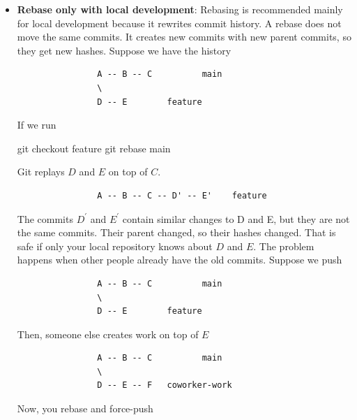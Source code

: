 \documentclass{report}
\begin{document}
\begin{itemize}
        \item \textbf{Rebase only with local development}: 
            Rebasing is recommended mainly for local development because it rewrites commit history.
            \bigbreak \noindent 
            A rebase does not move the same commits. It creates new commits with new parent commits, so they get new hashes.
            \bigbreak \noindent 
            Suppose we have the history
            \bigbreak \noindent 
            \begin{verbatim}
                A -- B -- C          main
                \
                D -- E        feature
            \end{verbatim}
            \bigbreak \noindent 
            If we run
            \bigbreak \noindent 
            \begin{bashcode}
                git checkout feature
                git rebase main
            \end{bashcode}
            \bigbreak \noindent 
            Git replays $D$ and $E$ on top of $C$.
            \bigbreak \noindent 
            \begin{verbatim}
                A -- B -- C -- D' -- E'    feature 
            \end{verbatim}
            \bigbreak \noindent 
            The commits $D^{\prime}$ and $E^{\prime}$ contain similar changes to D and E, but they are not the same commits. Their parent changed, so their hashes changed.
            \bigbreak \noindent 
            That is safe if only your local repository knows about $D$ and $E$.
            \bigbreak \noindent 
            The problem happens when other people already have the old commits.
            \bigbreak \noindent 
            Suppose we push
            \bigbreak \noindent 
            \begin{verbatim}
                A -- B -- C          main
                \
                D -- E        feature     
            \end{verbatim}
            \bigbreak \noindent 
            Then, someone else creates work on top of $E$
            \bigbreak \noindent 
            \begin{verbatim}
                A -- B -- C          main
                \
                D -- E -- F   coworker-work 
            \end{verbatim}
            \bigbreak \noindent 
            Now, you rebase and force-push
            \bigbreak \noindent 
            \begin{verbatim}

\end{verbatim}
\end{itemize}
\end{document}
